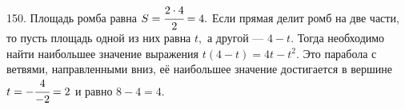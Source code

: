150. Площадь ромба равна $S=\cfrac{2\cdot4}{2}=4.$ Если прямая делит ромб на две части, то пусть площадь одной из них равна $t,$ а другой --- $4-t.$ Тогда необходимо найти наибольшее значение выражения $t(4-t)=4t-t^2.$ Это парабола с ветвями, направленными вниз, её наибольшее значение достигается в вершине $t=-\cfrac{4}{-2}=2$ и равно $8-4=4.$\\
